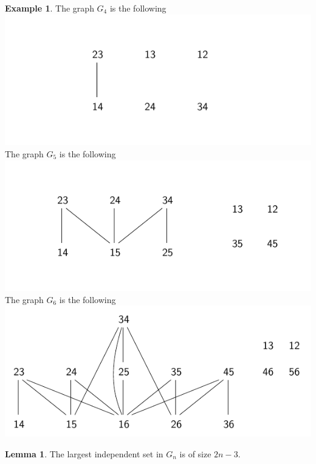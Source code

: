 \documentclass{scrartcl}
\theoremstyle{definition}
\newtheorem{lemma}[subsection]{Lemma}
\newtheorem{example}[subsection]{Example}
\begin{document}
\begin{example}
    \label{ex:Gn}
    The graph $G_4$ is the following
    \\\includegraphics[width = \textwidth]{graph4.pdf}
    The graph $G_5$ is the following
    \\\includegraphics[width = \textwidth]{graph5.pdf}
    The graph $G_6$ is the following
    \\\includegraphics[width = \textwidth]{graph6.pdf}
\end{example}
\begin{lemma}
    The largest independent set in $G_n$ is of size $2n - 3$.
\end{lemma}
\end{document}
